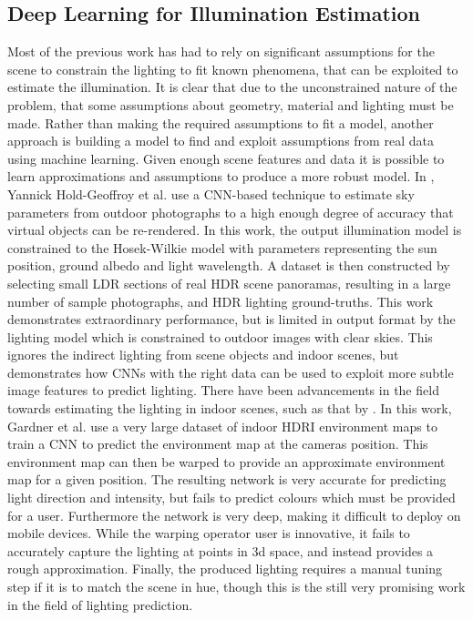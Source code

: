 \documentclass[ %
                    author={Gavin Parker},
                supervisor={Dr. Neill Campbell},
                    degree={MEng},
                     title={Deep Siamese Networks for Illumination Estimation from Stereo Images},
                  subtitle={},
                      type={research},
                      year={2018} ]{dissertation}
\begin{document}
\subsection{Deep Learning for Illumination Estimation}
Most of the previous work has had to rely on significant assumptions for the scene to constrain the lighting to fit known phenomena, that can be exploited to estimate the illumination. It is clear that due to the unconstrained nature of the problem, that some assumptions about geometry, material and lighting must be made. Rather than making the required assumptions to fit a model, another approach is building a model to find and exploit assumptions from real data using machine learning. Given enough scene features and data it is possible to learn approximations and assumptions to produce a more robust model. In \cite{holdgeoffroy-cvpr-17}, Yannick Hold-Geoffroy et al. use a CNN-based technique to estimate sky parameters from outdoor photographs to a high enough degree of accuracy that virtual objects can be re-rendered. In this work, the output illumination model is constrained to the Hosek-Wilkie model with parameters representing the sun position, ground albedo and light wavelength. A dataset is then constructed by selecting small LDR sections of real HDR scene panoramas, resulting in a large number of sample photographs, and HDR lighting ground-truths. This work demonstrates extraordinary performance, but is limited in output format by the lighting model which is constrained to outdoor images with clear skies. This ignores the indirect lighting from scene objects and indoor scenes, but demonstrates how CNNs with the right data can be used to exploit more subtle image features to predict lighting.
\newline
There have been advancements in the field towards estimating the lighting in indoor scenes, such as that by \cite{Gardner:2017:LPI:3130800.3130891}. In this work, Gardner et al. use a very large dataset of indoor HDRI environment maps to train a CNN to predict the environment map at the cameras position. This environment map can then be warped to provide an approximate environment map for a given position. The resulting network is very accurate for predicting light direction and intensity, but fails to predict colours which must be provided for a user. Furthermore the network is very deep, making it difficult to deploy on mobile devices. While the warping operator user is innovative, it fails to accurately capture the lighting at points in 3d space, and instead provides a rough approximation. Finally, the produced lighting requires a manual tuning step if it is to match the scene in hue, though this is the still very promising work in the field of lighting prediction.
\end{document}
